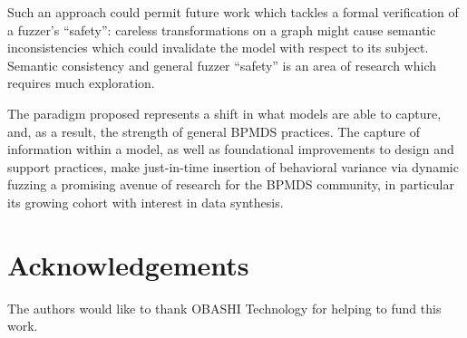 \documentclass[draft,12pt]{llncs}  %
\begin{document}

Such an approach could permit future work which tackles a formal verification of
a fuzzer's ``safety'': careless transformations on a graph might cause semantic
inconsistencies which could invalidate the model with respect to its
subject. Semantic consistency and general fuzzer ``safety'' is an area
of research which requires much exploration.
\par

The paradigm proposed represents a shift in what models are able to capture,
and, as a result, the strength of general BPMDS practices. The capture of
information within a model, as well as foundational improvements
to design and support practices, make just-in-time insertion of behavioral
variance via dynamic fuzzing a promising avenue of research for the BPMDS
community, in particular its growing cohort with interest in data synthesis.
\par

\section*{Acknowledgements}
The authors would like to thank OBASHI Technology for helping to fund this work.


\end{document}
